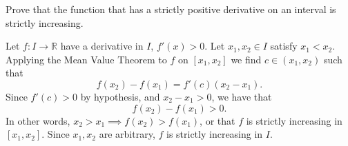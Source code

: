 \documentclass[boxes, qed]{homework}
\begin{document}
\begin{problem}Prove that the function that has a strictly positive derivative
  on an interval is strictly increasing.
\end{problem}
\begin{solution}Let $f:I\to\mathbb{R}$ have a derivative in $I$, $f'(x)>0$.
  Let $x_1,x_2\in{I}$ satisfy $x_1<x_2$. Applying the Mean Value Theorem
  to $f$ on $[x_1,x_2]$ we find $c\in{(x_1,x_2)}$ such that
  $$f(x_2)-f(x_1)=f'(c)(x_2-x_1).$$
  Since $f'(c)>0$ by hypothesis, and $x_2-x_1>0$, we have that
  $$f(x_2)-f(x_1)>0.$$
  In other words, $x_2>x_1 \implies f(x_2)>f(x_1)$, or that
  $f$ is strictly increasing in $[x_1,x_2]$. Since $x_1,x_2$
  are arbitrary, $f$ is strictly increasing in $I$.
\end{solution}
\end{document}
